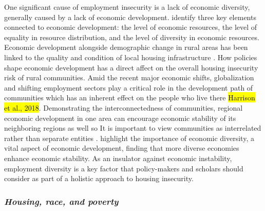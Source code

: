 One significant cause of employment insecurity is a lack of economic diversity, generally caused by a lack of economic development. \citet{sherrieb_measuring_2010} identify three key elements connected to economic development: the level of economic resources, the level of equality in resource distribution, and the level of diversity in economic resources. Economic development alongside demographic change in rural areas has been linked to the quality and condition of local housing infrastructure \citep{barcus_heterogeneity_2011}. How policies shape economic development has a direct affect on the overall housing insecurity risk of rural communities. Amid the recent major economic shifts, globalization and shifting employment sectors play a critical role in the development path of communities which has an inherent effect on the people who live there \hl{Harrison et al., 2018}. Demonstrating the interconnectedness of communities, regional economic development in one area can encourage economic stability of its neighboring regions as well so It is important to view communities as interrelated rather than separate entities \citep{chen_economic_2018}. \citet{deller_spatial_2016} highlight the importance of economic diversity, a vital aspect of economic development, finding that more diverse economies enhance economic stability. As an insulator against economic instability, employment diversity is a key factor that policy-makers and scholars should consider as part of a holistic approach to housing insecurity. 

\subsubsection{\textit{Housing, race, and poverty}}

